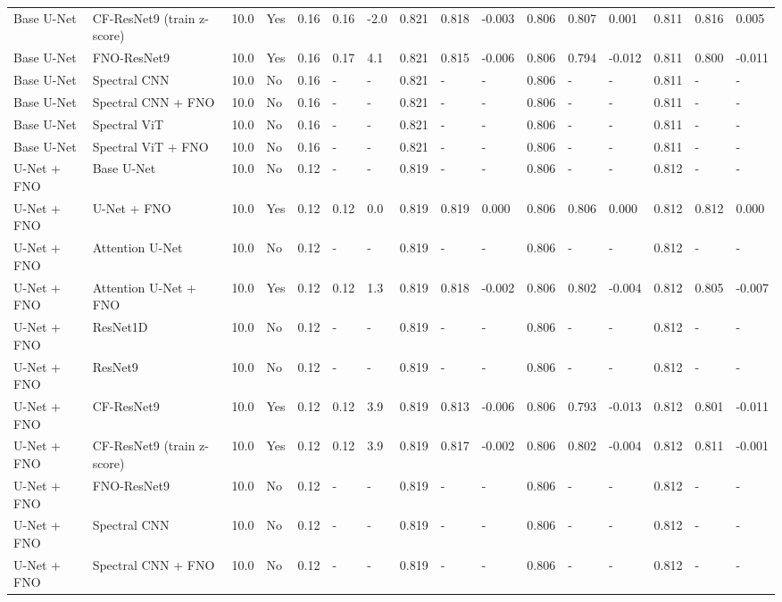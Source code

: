 \begin{longtable}{llllllllllllllll}
Base U-Net & CF-ResNet9 (train z-score) & 10.0 & Yes & 0.16 & 0.16 & -2.0 & 0.821 & 0.818 & -0.003 & 0.806 & 0.807 & 0.001 & 0.811 & 0.816 & 0.005 \\
Base U-Net & FNO-ResNet9 & 10.0 & Yes & 0.16 & 0.17 & 4.1 & 0.821 & 0.815 & -0.006 & 0.806 & 0.794 & -0.012 & 0.811 & 0.800 & -0.011 \\
Base U-Net & Spectral CNN & 10.0 & No & 0.16 & - & - & 0.821 & - & - & 0.806 & - & - & 0.811 & - & - \\
Base U-Net & Spectral CNN + FNO & 10.0 & No & 0.16 & - & - & 0.821 & - & - & 0.806 & - & - & 0.811 & - & - \\
Base U-Net & Spectral ViT & 10.0 & No & 0.16 & - & - & 0.821 & - & - & 0.806 & - & - & 0.811 & - & - \\
Base U-Net & Spectral ViT + FNO & 10.0 & No & 0.16 & - & - & 0.821 & - & - & 0.806 & - & - & 0.811 & - & - \\
U-Net + FNO & Base U-Net & 10.0 & No & 0.12 & - & - & 0.819 & - & - & 0.806 & - & - & 0.812 & - & - \\
U-Net + FNO & U-Net + FNO & 10.0 & Yes & 0.12 & 0.12 & 0.0 & 0.819 & 0.819 & 0.000 & 0.806 & 0.806 & 0.000 & 0.812 & 0.812 & 0.000 \\
U-Net + FNO & Attention U-Net & 10.0 & No & 0.12 & - & - & 0.819 & - & - & 0.806 & - & - & 0.812 & - & - \\
U-Net + FNO & Attention U-Net + FNO & 10.0 & Yes & 0.12 & 0.12 & 1.3 & 0.819 & 0.818 & -0.002 & 0.806 & 0.802 & -0.004 & 0.812 & 0.805 & -0.007 \\
U-Net + FNO & ResNet1D & 10.0 & No & 0.12 & - & - & 0.819 & - & - & 0.806 & - & - & 0.812 & - & - \\
U-Net + FNO & ResNet9 & 10.0 & No & 0.12 & - & - & 0.819 & - & - & 0.806 & - & - & 0.812 & - & - \\
U-Net + FNO & CF-ResNet9 & 10.0 & Yes & 0.12 & 0.12 & 3.9 & 0.819 & 0.813 & -0.006 & 0.806 & 0.793 & -0.013 & 0.812 & 0.801 & -0.011 \\
U-Net + FNO & CF-ResNet9 (train z-score) & 10.0 & Yes & 0.12 & 0.12 & 3.9 & 0.819 & 0.817 & -0.002 & 0.806 & 0.802 & -0.004 & 0.812 & 0.811 & -0.001 \\
U-Net + FNO & FNO-ResNet9 & 10.0 & No & 0.12 & - & - & 0.819 & - & - & 0.806 & - & - & 0.812 & - & - \\
U-Net + FNO & Spectral CNN & 10.0 & No & 0.12 & - & - & 0.819 & - & - & 0.806 & - & - & 0.812 & - & - \\
U-Net + FNO & Spectral CNN + FNO & 10.0 & No & 0.12 & - & - & 0.819 & - & - & 0.806 & - & - & 0.812 & - & - \\

\end{longtable}
